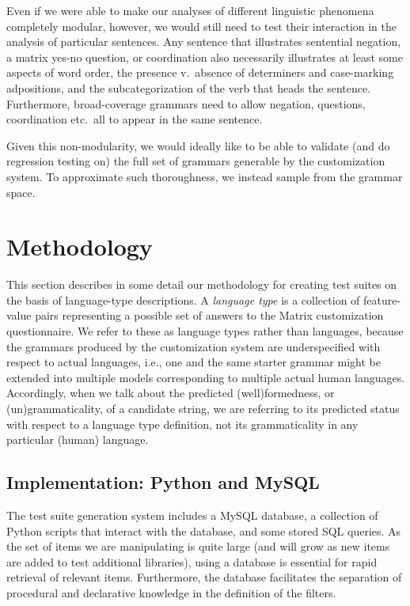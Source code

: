 \documentclass[11pt]{article}
\begin{document}
Even if we were able to make our analyses of different linguistic
phenomena completely modular, however, we would still need to test
their interaction in the analysis of particular sentences.
Any sentence that illustrates sentential negation, a matrix yes-no
question, or coordination also necessarily illustrates at least some
aspects of word order, the presence v.\ absence of determiners and
case-marking adpositions, and the subcategorization of the verb that
heads the sentence.  Furthermore, broad-coverage grammars need to
allow negation, questions, coordination etc.\ all to appear in the
same sentence.

Given this non-modularity, we would ideally like to be able to
validate (and do regression testing on) the full set of grammars
generable by the customization system.  To approximate such
thoroughness, we instead sample from the grammar space.

\section{Methodology}
\label{arch}

This section describes in some detail our methodology for creating
test suites on the basis of language-type descriptions.  A {\it
language type} is a collection of feature-value pairs representing a
possible set of answers to the Matrix customization questionnaire. We
refer to these as language types rather than languages, because the
grammars produced by the customization system are underspecified with
respect to actual languages, i.e., one and the same starter grammar
might be extended into multiple models corresponding to multiple
actual human languages.  Accordingly, when we talk about the predicted
(well)formedness, or (un)grammaticality, of a candidate string, we are referring to its
predicted status with respect to a language type definition, not its
grammaticality in any particular (human) language.

\subsection{Implementation: Python and MySQL}

The test suite generation system includes a MySQL database, a collection
of Python scripts that interact with the database, and some stored
SQL queries.  As the set of items we are manipulating is quite large
(and will grow as new items are added to test additional libraries),
using a database is essential for rapid retrieval of relevant items.
Furthermore, the database facilitates the separation of procedural
and declarative knowledge in the definition of the filters.
\end{document}
